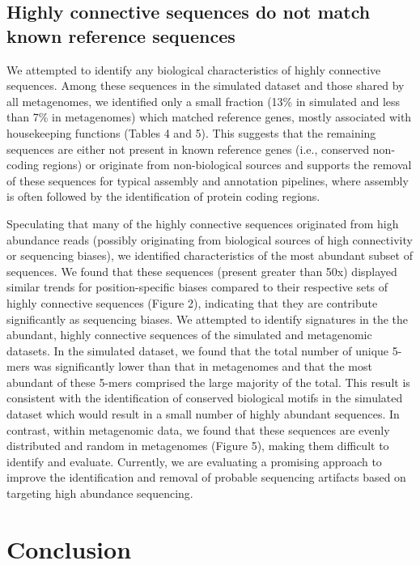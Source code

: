 \documentclass[10pt]{article}
\begin{document}
\subsection*{Highly connective sequences do not match known reference sequences}

We attempted to identify any biological characteristics of highly connective sequences.  Among these sequences in the simulated dataset and those shared by all metagenomes, we identified only a small fraction (13\% in simulated and less than 7\% in metagenomes) which matched reference genes, mostly associated with housekeeping functions (Tables 4 and 5).  This suggests that the remaining sequences are either not present in known reference genes (i.e., conserved non-coding regions) or originate from non-biological sources and supports the removal of these sequences for typical assembly and annotation pipelines, where assembly is often followed by the identification of protein coding regions.

Speculating that many of the highly connective sequences originated from high abundance reads (possibly originating from biological sources of high connectivity or sequencing biases), we identified characteristics of the most abundant subset of sequences.  We found that these sequences (present greater than 50x) displayed similar trends for position-specific biases compared to their respective sets of highly connective sequences (Figure 2), indicating that they are contribute significantly as sequencing biases.  We attempted to identify signatures in the the abundant, highly connective sequences of the simulated and metagenomic datasets.  In the simulated dataset, we found that the total number of unique 5-mers was significantly lower than that in metagenomes and that the most abundant of these 5-mers comprised the large majority of the total.  This result is consistent with the identification of conserved biological motifs in the simulated dataset which would result in a small number of highly abundant sequences.  In contrast, within metagenomic data, we found that these sequences are evenly distributed and random in metagenomes (Figure 5), making them difficult to identify and evaluate.  Currently, we are evaluating a promising approach to improve the identification and removal of probable sequencing artifacts based on targeting high abundance sequencing. 

\section*{Conclusion}
\end{document}
